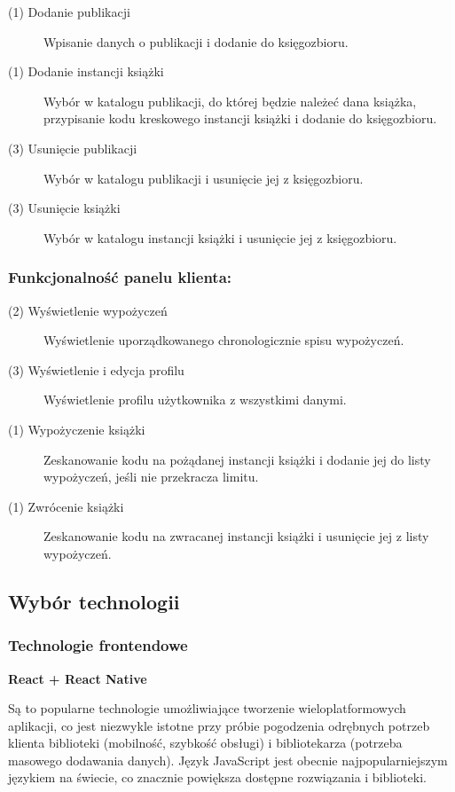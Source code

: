 \documentclass[]{report}
\begin{document}
\begin{description} 
    \item[(1) Dodanie publikacji] Wpisanie danych o publikacji i dodanie do księgozbioru.
    \item[(1) Dodanie instancji książki] Wybór w katalogu publikacji, do której będzie należeć dana książka, przypisanie kodu kreskowego instancji książki i dodanie do księgozbioru.
    \item[(3) Usunięcie publikacji] Wybór w katalogu publikacji i usunięcie jej z księgozbioru. 
    \item[(3) Usunięcie książki] Wybór w katalogu instancji książki i usunięcie jej z księgozbioru.
\end{description}

\subsubsection{Funkcjonalność panelu klienta:}

\begin{description}
    \item[(2) Wyświetlenie wypożyczeń] Wyświetlenie uporządkowanego chronologicznie spisu wypożyczeń.
    \item[(3) Wyświetlenie i edycja profilu] Wyświetlenie profilu użytkownika z wszystkimi danymi.
    \item[(1) Wypożyczenie książki] Zeskanowanie kodu na pożądanej instancji książki i dodanie jej do listy wypożyczeń, jeśli nie przekracza limitu.
    \item[(1) Zwrócenie książki] Zeskanowanie kodu na zwracanej instancji książki i usunięcie jej z listy wypożyczeń.
\end{description}


\subsection{Wybór technologii}

\subsubsection{Technologie frontendowe}

\textbf{React + React Native}

Są to popularne technologie umożliwiające tworzenie wieloplatformowych aplikacji, co jest niezwykle istotne przy próbie pogodzenia odrębnych potrzeb klienta biblioteki (mobilność, szybkość obsługi) i bibliotekarza (potrzeba masowego dodawania danych). Język JavaScript jest obecnie najpopularniejszym językiem na świecie, co znacznie powiększa dostępne rozwiązania i biblioteki.
\end{document}

